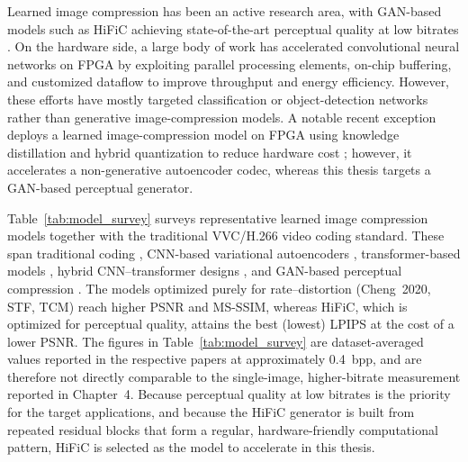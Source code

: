 Learned image compression has been an active research area, with GAN-based models such as HiFiC achieving state-of-the-art perceptual quality at low bitrates \cite{mentzer2020high}. On the hardware side, a large body of work has accelerated convolutional neural networks on FPGA by exploiting parallel processing elements, on-chip buffering, and customized dataflow to improve throughput and energy efficiency. However, these efforts have mostly targeted classification or object-detection networks rather than generative image-compression models. A notable recent exception deploys a learned image-compression model on FPGA using knowledge distillation and hybrid quantization to reduce hardware cost \cite{mazouz2025lightweight}; however, it accelerates a non-generative autoencoder codec, whereas this thesis targets a GAN-based perceptual generator.

Table~\ref{tab:model_survey} surveys representative learned image compression models together with the traditional VVC/H.266 video coding standard. These span traditional coding \cite{bross2021vvc}, CNN-based variational autoencoders \cite{cheng2020learned}, transformer-based models \cite{zou2022stf}, hybrid CNN--transformer designs \cite{liu2023tcm}, and GAN-based perceptual compression \cite{mentzer2020high}. The models optimized purely for rate--distortion (Cheng~2020, STF, TCM) reach higher PSNR and MS-SSIM, whereas HiFiC, which is optimized for perceptual quality, attains the best (lowest) LPIPS at the cost of a lower PSNR. The figures in Table~\ref{tab:model_survey} are dataset-averaged values reported in the respective papers at approximately 0.4~bpp, and are therefore not directly comparable to the single-image, higher-bitrate measurement reported in Chapter~4. Because perceptual quality at low bitrates is the priority for the target applications, and because the HiFiC generator is built from repeated residual blocks that form a regular, hardware-friendly computational pattern, HiFiC is selected as the model to accelerate in this thesis.


